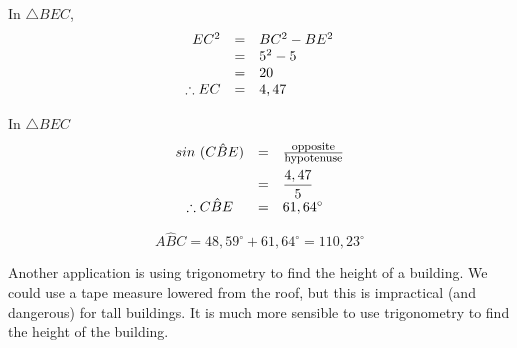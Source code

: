 \begin{wex}
{In $\triangle BEC$, \\

\begin{equation*}
\begin{array}{ccl}
 \hfill EC^{2} &=& BC^{2} - BE^{2} \hfill \\
\hfill &=& 5^{2} - 5 \hfill \\
\hfill &=& 20 \hfill \\
\therefore EC &=& 4,47 \hfill
\end{array}
\end{equation*}

In $\triangle BEC$ 
\begin{equation*}
\begin{array}{ccl}\hfill sin~(C\hat{B}E)& =& \frac{\mbox{\footnotesize opposite}}{\mbox{\footnotesize hypotenuse}}\hfill \vspace{5pt}\\
 \hfill & =& \dfrac{4,47}{5}\hfill \\
 \therefore C\hat{B}E& =& {61,64}^{\circ }\hfill 
\end{array}
\end{equation*}

\begin{equation*}
A\hat{B}C = 48,59^{\circ} + 61,64^{\circ} = 110,23^{\circ}
\end{equation*}
}
\end{wex}



  
Another application is using trigonometry to find the height of a building. We could use a tape measure lowered from the roof, but this is impractical (and dangerous) for tall buildings. It is much more sensible to use trigonometry to find the height of the building.\par 


